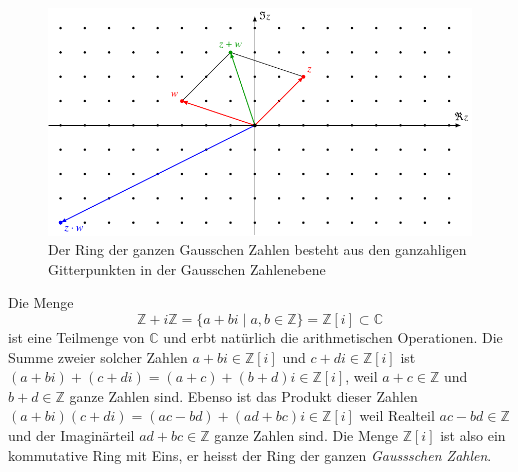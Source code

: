 \begin{beispiel}
\begin{figure}
\centering
\includegraphics{chapters/10-vektorenmatrizen/images/gausszahlen.pdf}
%
%
%
\caption{Der Ring der ganzen Gausschen Zahlen besteht aus den ganzahligen
Gitterpunkten in der Gausschen Zahlenebene
\label{buch:vektorenmatrizen:fig:ganzgauss}}
\end{figure}
Die Menge
\[
\mathbb{Z} + i\mathbb{Z}
=
\{a+bi\;|\; a,b\in\mathbb{Z}\}
=
\mathbb{Z}[i]
\subset
\mathbb{C}
\]
ist eine Teilmenge von $\mathbb{C}$ und erbt natürlich die 
arithmetischen Operationen.
Die Summe zweier solcher Zahlen $a+bi\in\mathbb{Z}[i]$ und
$c+di\in\mathbb{Z}[i]$ ist
$(a+bi)+(c+di)=(a+c) + (b+d)i\in \mathbb{Z}[i]$, weil $a+c\in\mathbb{Z}$
und $b+d\in\mathbb{Z}$ ganze Zahlen sind.
Ebenso ist das Produkt dieser Zahlen
\(
(a+bi)(c+di)
=
(ac-bd) + (ad+bc)i
\in \mathbb{Z}[i]
\)
weil Realteil $ac-bd\in\mathbb{Z}$ und der Imaginärteil $ad+bc\in\mathbb{Z}$
ganze Zahlen sind.
Die Menge $\mathbb{Z}[i]$ ist also ein kommutative Ring mit Eins, er
heisst der Ring der ganzen {\em Gaussschen Zahlen}.
%
\end{beispiel}

